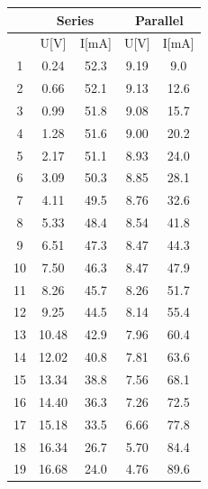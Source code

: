 \documentclass{article}
\begin{document}
{\begin{table}[H]
\centering
\begin{tabular}{@{}c|cc||cc@{}}
\toprule
\multirow{2}{*}{} & \multicolumn{2}{c||}{Series} & \multicolumn{2}{c}{Parallel} \\ \midrule
                  & U[V]         & I[mA]       & U[V]         & I[mA]         \\ \midrule
1                 & 0.24         & 52.3        & 9.19         & 9.0           \\
2                 & 0.66         & 52.1        & 9.13         & 12.6          \\
3                 & 0.99         & 51.8        & 9.08         & 15.7          \\
4                 & 1.28         & 51.6        & 9.00         & 20.2          \\
5                 & 2.17         & 51.1        & 8.93         & 24.0          \\
6                 & 3.09         & 50.3        & 8.85         & 28.1          \\
7                 & 4.11         & 49.5        & 8.76         & 32.6          \\
8                 & 5.33         & 48.4        & 8.54         & 41.8          \\
9                 & 6.51         & 47.3        & 8.47         & 44.3          \\
10                & 7.50         & 46.3        & 8.47         & 47.9          \\
11                & 8.26         & 45.7        & 8.26         & 51.7          \\
12                & 9.25         & 44.5        & 8.14         & 55.4          \\
13                & 10.48        & 42.9        & 7.96         & 60.4          \\
14                & 12.02        & 40.8        & 7.81         & 63.6          \\
15                & 13.34        & 38.8        & 7.56         & 68.1          \\
16                & 14.40        & 36.3        & 7.26         & 72.5          \\
17                & 15.18        & 33.5        & 6.66         & 77.8          \\
18                & 16.34        & 26.7        & 5.70         & 84.4          \\
19                & 16.68        & 24.0        & 4.76         & 89.6          \\

\end{tabular}
\end{table}}
\end{document}
